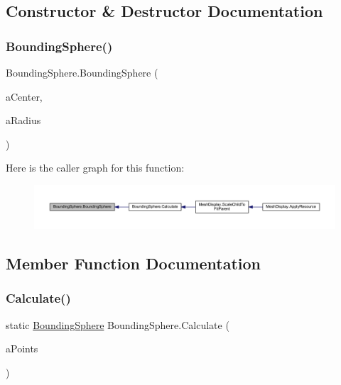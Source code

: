 \subsection{Constructor \& Destructor Documentation}
\mbox{\label{class_bounding_sphere_ad35e7960a2e532e8f7cbebbca2136ef7}} 
\subsubsection{\texorpdfstring{Bounding\+Sphere()}{BoundingSphere()}}
{\footnotesize\ttfamily Bounding\+Sphere.\+Bounding\+Sphere (\begin{DoxyParamCaption}\item[{Vector3}]{a\+Center,  }\item[{float}]{a\+Radius }\end{DoxyParamCaption})}

Here is the caller graph for this function\+:
\nopagebreak
\begin{figure}[H]
\begin{center}
\leavevmode
\includegraphics[width=350pt]{class_bounding_sphere_ad35e7960a2e532e8f7cbebbca2136ef7_icgraph}
\end{center}
\end{figure}


\subsection{Member Function Documentation}
\mbox{\label{class_bounding_sphere_a29c277d13a701089666b94fabf3c87d6}} 
\subsubsection{\texorpdfstring{Calculate()}{Calculate()}}
{\footnotesize\ttfamily static \mbox{\hyperlink{class_bounding_sphere}{Bounding\+Sphere}} Bounding\+Sphere.\+Calculate (\begin{DoxyParamCaption}\item[{I\+Enumerable$<$ Vector3 $>$}]{a\+Points }\end{DoxyParamCaption})\hspace{0.3cm}{\ttfamily [static]}}



